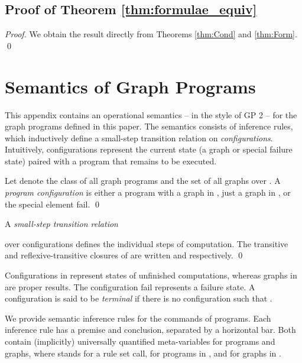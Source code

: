 \documentclass{llncs}
\begin{document}
	\subsection{Proof of Theorem \ref{thm:formulae_equiv}}\label{thm:formulae_equiv:PROOF}
	
	\begin{proof}
		We obtain the result directly from Theorems \ref{thm:Cond} and \ref{thm:Form}.
		\qed
	\end{proof}












	\newpage\section{Semantics of Graph Programs}\label{app:semantics}
	
	This appendix contains an operational semantics -- in the style of GP 2 \cite{Plump12a} -- for the graph programs defined in this paper. The semantics consists of inference rules, which inductively define a small-step transition relation  on \emph{configurations}. Intuitively, configurations represent the current state (a graph or special failure state) paired with a program that remains to be executed.

	\begin{definition}[Configuration]\rm
		Let  denote the class of all graph programs and  the set of all graphs over . A \emph{program configuration} is either a program with a graph in , just a graph in , or the special element fail.	
		\qed
	\end{definition}

	\begin{definition}\rm
	    A \emph{small-step transition relation}
	
	\noindent over configurations defines the individual steps of computation. The transitive and reflexive-transitive closures of  are written  and  respectively.
		\qed
	\end{definition}

	Configurations in  represent states of unfinished computations, whereas graphs in  are proper results. The configuration fail represents a failure state. A configuration  is said to be \emph{terminal} if there is no configuration  such that .

	We provide semantic inference rules for the commands of programs. Each inference rule has a premise and conclusion, separated by a horizontal bar. Both contain (implicitly) universally quantified meta-variables for programs and graphs, where  stands for a rule set call,  for programs in , and  for graphs in .
\end{document}
